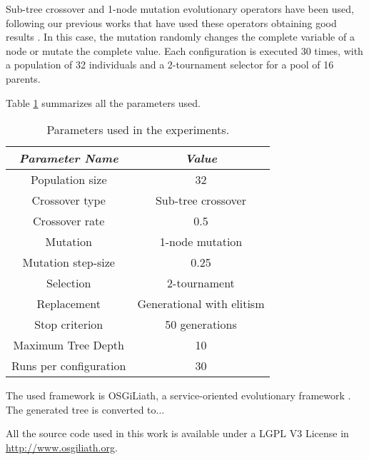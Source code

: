 \documentclass[a4paper,10pt,twocolumn,preprint,3p]{elsarticle}
\begin{document}
Sub-tree crossover and 1-node mutation evolutionary operators have been used, following our previous works that have used these operators obtaining good results \cite{EvoStar2014:GPBot}. In this case, the mutation randomly changes the complete variable of a node or mutate the complete value. Each configuration is executed 30 times, with a population of 32 individuals and a 2-tournament selector for a pool of 16 parents.


Table \ref{tab:parameters} summarizes all the parameters used.

\begin{table}
\begin{center}
\begin{tabular}{|c|c|}
\hline
{\em Parameter Name} & {\em Value} \\\hline
Population size & 32 \\\hline
Crossover type & Sub-tree crossover \\ \hline
Crossover rate & 0.5\\ \hline
Mutation  & 1-node mutation\\ \hline
Mutation step-size & 0.25 \\ \hline
Selection & 2-tournament \\ \hline
Replacement & Generational with elitism\\ \hline
Stop criterion & 50 generations \\ \hline
Maximum Tree Depth & 10 \\ \hline %
Runs per configuration & 30 \\ \hline
\end{tabular}
\caption{Parameters used in the experiments.}
\label{tab:parameters}
\end{center}
\end{table}

The used framework is OSGiLiath, a service-oriented evolutionary
framework \cite{DBLP:journals/soco/Garcia-SanchezGCAG13}. The
generated tree is converted to...

All the source code used in this
work is available under a LGPL V3 License in
\url{http://www.osgiliath.org}. 


\end{document}
